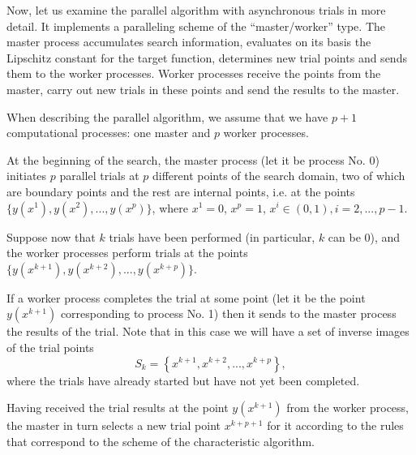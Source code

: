 \documentclass{svproc}
\begin{document}
Now, let us examine the parallel algorithm with asynchronous trials in more detail. It implements a paralleling scheme of the ``master/worker'' type. The master process accumulates search information, evaluates on its basis the Lipschitz constant for the target function, determines new trial points and sends them to the worker processes. Worker processes receive the points from the master, carry out new trials in these points and send the results to the master.

When describing the parallel algorithm, we assume that we have $p+1$ computational processes: one master and $p$ worker processes.
 
At the beginning of the search, the master process (let it be process No. 0) initiates $p$ parallel  trials at $p$ different points of the search domain, two of which are boundary points and the rest are internal points, i.e. at the points $\{y(x^1), y(x^2), ...,y(x^p)\}$, where $x^1 = 0$, $x^p = 1$, $x^i\in(0,1), i=2,..., p-1$.

Suppose now that $k$ trials have been performed (in particular, $k$ can be 0), and the worker processes perform trials at the points $\{y(x^{k+1}), y(x^{k+2}), ...,y(x^{k+p})\}$. 

If a worker process completes the trial at some point (let it be the point $y(x^{k+1})$ corresponding to process No. 1) then it sends to the master process the results of the trial. Note that in this case we will have a set of inverse images of the trial points
\[
S_k = \left\{ x^{k+1},x^{k+2},...,x^{k+p} \right\},
\]
where the trials have already started but have not yet been completed.

Having received the trial results at the point $y(x^{k+1})$ from the worker process, the master in turn selects a new trial point $x^{k+p+1}$ for it according to the rules that correspond to the scheme of the characteristic algorithm.
\end{document}
